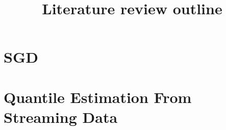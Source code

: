 \documentclass[12pt]{article}
\title{Literature review outline}
\date{\vspace{-5ex}}
\begin{document}
\maketitle

\section{SGD 
            \color{blue}{(should it be in Background instead?)}}
    

\section{Quantile Estimation From Streaming Data}
\begin{enumerate}






\end{enumerate}
\end{document}
